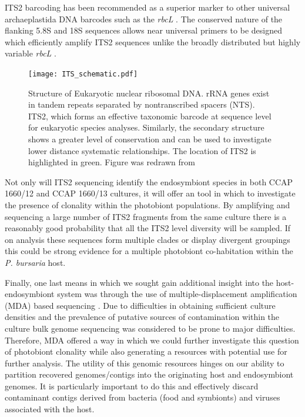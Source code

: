 ITS2 barcoding has been recommended as a superior marker to 
other universal archaeplastida DNA barcodes such as the \textit{rbcL} 
\citep{Chen2010}.  The conserved nature of the flanking 5.8S and
18S sequences allows near universal primers to be designed which efficiently 
amplify ITS2 sequences unlike the broadly distributed but
highly variable \textit{rbcL} \citep{Buchheim2011}.

\begin{figure}[h]
    \texttt{[image: ITS\_schematic.pdf]}
    \caption[ITS2 Structure]{Structure of Eukaryotic nuclear ribosomal DNA.
        rRNA genes exist in tandem repeats separated by nontranscribed spacers (NTS).
        ITS2, which forms an effective taxonomic barcode at sequence level 
        for eukaryotic species analyses.  Similarly, the secondary structure
        shows a greater level of conservation and can be used to investigate
        lower distance systematic relationships.  The location of ITS2
        is highlighted in green.
        Figure was redrawn from \citep{Shi2005}}
\label{fig:its2_schematic}
\end{figure}

Not only will ITS2 sequencing identify the endosymbiont species in
both CCAP 1660/12 and CCAP 1660/13 cultures, it will offer an
tool in which to investigate the presence of clonality within the
photobiont populations.  By amplifying and sequencing a large number of 
ITS2 fragments from the same culture there is a reasonably
good probability that all the ITS2 level diversity will be sampled. 
If on analysis these sequences form multiple clades or 
display divergent groupings this could be strong evidence
for a multiple photobiont co-habitation within the \textit{P. bursaria}
host. 


Finally, one last means in which we sought 
gain additional insight into the host-endosymbiont
system was through the use of multiple-displacement amplification (MDA)
based sequencing \citep{Lasken2007}. Due to difficulties in obtaining sufficient
culture densities and the prevalence of putative sources of contamination
within the culture bulk genome sequencing was considered to be prone to 
major difficulties.  Therefore, MDA offered a way in which 
we could further investigate this question of photobiont clonality
while also generating a resources with potential use for further analysis.
The utility of this genomic resources hinges on our ability to 
partition recovered genomes/contigs into the originating host
and endosymbiont genomes.  It is particularly important to do this
and effectively discard contaminant contigs derived from 
bacteria (food and symbionts) and viruses associated with the host. 

